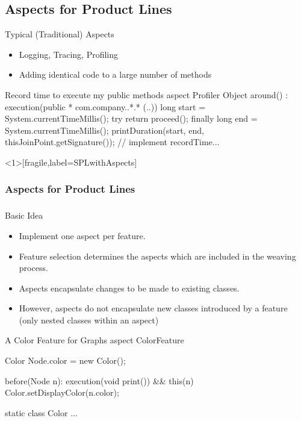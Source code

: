 \subsection{Aspects for Product Lines}

\begin{frame}[fragile]{Typical (Traditional) Aspects}
	\begin{itemize}
		\item Logging, Tracing, Profiling
		\item Adding identical code to a large number of methods
	\end{itemize}
\begin{codetight}{Record time to execute my public methods}
aspect Profiler {   
    Object around() : execution(public * com.company..*.* (..)) {
        long start = System.currentTimeMillis();
        try {
            return proceed();
        } finally {
            long end = System.currentTimeMillis();
            printDuration(start, end, 
                thisJoinPoint.getSignature());
        }
    }
    // implement recordTime...
}
\end{codetight}	
\end{frame}

\begin{frame}<1>[fragile,label=SPLwithAspects]
	\frametitle<1>{Aspects for Product Lines}
	\frametitle<2>{\myframetitle}
	\begin{fancycolumns}[widths={45},animation=none]
		\begin{definition}{Basic Idea}
			\begin{itemize}
				\item Implement one aspect per feature.
				\item Feature selection determines the aspects which are included in the weaving process.
			\end{itemize}
		\end{definition}
		\begin{note}{}
			\begin{itemize}
				\item Aspects encapsulate changes to be made to existing classes. 
				\item However, aspects do not encapsulate new classes introduced by a feature (only nested classes within an aspect)%
			\end{itemize}
		\end{note}
	\nextcolumn
\begin{codetight}{A Color Feature for Graphs}
aspect ColorFeature {
	Color Node.color = new Color();
	
	before(Node n): execution(void print()) && this(n) {
		Color.setDisplayColor(n.color);
	}
	
	static class Color {
		...
	}
}
\end{codetight}	
	\end{fancycolumns}
\end{frame}


